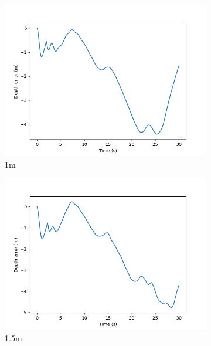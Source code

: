 \documentclass[class=article, crop=false]{standalone}
\begin{document}
\begin{figure}
\begin{subfigure}[b]{0.48\textwidth}
        \includegraphics{scenario1/rov-100m/1.0m/rov_depth_error_controlled}
        \caption{1m}
        \label{}
    \end{subfigure}
    \hfill
    \begin{subfigure}[b]{0.48\textwidth}
        \centering
        \includegraphics{scenario1/rov-100m/1.5m/rov_depth_error_controlled}
        \caption{1.5m}
        \label{}
    \end{subfigure}
    \vfill
    \begin{subfigure}[b]{0.48\textwidth}
        \centering

\end{subfigure}
\end{figure}
\end{document}

